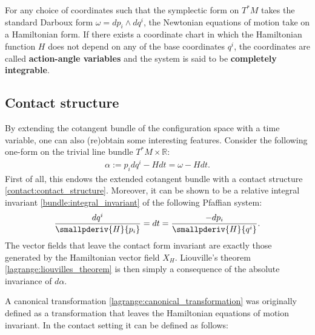     For any choice of coordinates such that the symplectic form on $T^*M$ takes the standard Darboux form $\omega=dp_i\wedge dq^i$, the Newtonian equations of motion take on a Hamiltonian form. If there exists a coordinate chart in which the Hamiltonian function $H$ does not depend on any of the base coordinates $q^i$, the coordinates are called \textbf{action-angle variables} and the system is said to be \textbf{completely integrable}.

\subsection{Contact structure}

    By extending the cotangent bundle of the configuration space with a time variable, one can also (re)obtain some interesting features. Consider the following one-form on the trivial line bundle $T^*M\times\mathbb{R}$:
    \begin{gather}
        \alpha := p_idq^i - Hdt = \omega - Hdt.
    \end{gather}
    First of all, this endows the extended cotangent bundle with a contact structure \ref{contact:contact_structure}. Moreover, it can be shown to be a relative integral invariant \ref{bundle:integral_invariant} of the following Pfaffian system:
    \begin{gather}
        \frac{dq^i}{\smallpderiv{H}{p_i}} = dt = \frac{-dp_i}{\smallpderiv{H}{q^i}}.
    \end{gather}
    The vector fields that leave the contact form invariant are exactly those generated by the Hamiltonian vector field $X_H$. Liouville's theorem \ref{lagrange:liouvilles_theorem} is then simply a consequence of the absolute invariance of $d\alpha$.

    A canonical transformation \ref{lagrange:canonical_transformation} was originally defined as a transformation that leaves the Hamiltonian equations of motion invariant. In the contact setting it can be defined as follows:

